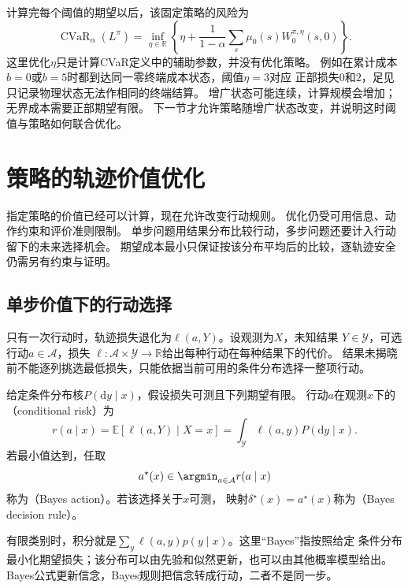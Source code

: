 计算完每个阈值的期望以后，该固定策略的风险为
\[
  \operatorname{CVaR}_\alpha(L^\pi)
  =\inf_{\eta\in\mathbb R}
    \left\{\eta+\frac{1}{1-\alpha}
      \sum_s\mu_0(s)W_0^{\pi,\eta}(s,0)\right\}.
\]
这里优化$\eta$只是计算CVaR定义中的辅助参数，并没有优化策略。
例如在累计成本$b=0$或$b=5$时都到达同一零终端成本状态，阈值$\eta=3$对应
正部损失$0$和$2$，足见只记录物理状态无法作相同的终端结算。
增广状态可能连续，计算规模会增加；无界成本需要正部期望有限。
下一节才允许策略随增广状态改变，并说明这时阈值与策略如何联合优化。

\section{策略的轨迹价值优化}
\label{sec:policy-value-optimization}

指定策略的价值已经可以计算，现在允许改变行动规则。
优化仍受可用信息、动作约束和评价准则限制。
单步问题用结果分布比较行动，多步问题还要计入行动留下的未来选择机会。
期望成本最小只保证按该分布平均后的比较，逐轨迹安全仍需另有约束与证明。

\subsection{单步价值下的行动选择}
\label{sec:decision-bayes-rules}

只有一次行动时，轨迹损失退化为$\ell(a,Y)$。设观测为$X$，未知结果
$Y\in\mathcal Y$，可选行动$a\in\mathcal A$，损失
$\ell:\mathcal A\times\mathcal Y\to\mathbb R$给出每种行动在每种结果下的代价。
结果未揭晓前不能逐列挑选最低损失，只能依据当前可用的条件分布选择一整项行动。

\begin{definition}[条件风险与Bayes决策]
\label{def:decision-conditional-risk-bayes-rule}
给定条件分布核$P(\mathrm dy\mid x)$，假设损失可测且下列期望有限。
行动$a$在观测$x$下的（conditional risk）为
\begin{equation}
  r(a\mid x)=\mathbb E[\ell(a,Y)\mid X=x]
  =\int_{\mathcal Y}\ell(a,y)P(\mathrm dy\mid x).
  \label{eq:decision-conditional-risk}
\end{equation}
若最小值达到，任取
\begin{equation}
  a^\star(x)\in\argmin_{a\in\mathcal A}r(a\mid x)
  \label{eq:decision-bayes-action}
\end{equation}
称为（Bayes action）。若该选择关于$x$可测，
映射$\delta^\star(x)=a^\star(x)$称为（Bayes decision rule）。
\end{definition}
有限类别时，积分就是$\sum_y\ell(a,y)p(y\mid x)$。这里“Bayes”指按照给定
条件分布最小化期望损失；该分布可以由先验和似然更新，也可以由其他概率模型给出。
Bayes公式更新信念，Bayes规则把信念转成行动，二者不是同一步。

